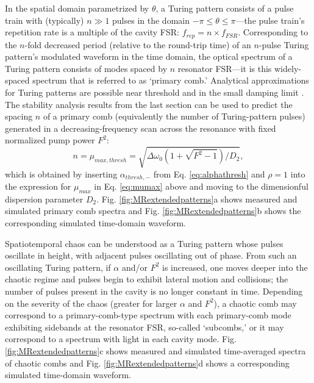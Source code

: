 In the spatial domain parametrized by $\theta$, a Turing pattern consists of a pulse train with (typically) $n\gg1$ pulses in the domain $-\pi\leq\theta\leq\pi$---the pulse train's repetition rate is a multiple of the cavity FSR: $f_{rep}=n\times f_{FSR}$. Corresponding to the $n$-fold decreased period (relative to the round-trip time) of an $n$-pulse Turing pattern's modulated waveform in the time domain, the optical spectrum of a Turing pattern consists of modes spaced by $n$ resonator FSR---it is this widely-spaced spectrum that is referred to as `primary comb.'  Analytical approximations for Turing patterns are possible near threshold \cite{Lugiato1987,Lugiato1987a} and in the small damping limit \cite{Renninger2016}. The stability analysis results from the last section can be used to predict the spacing $n$ of a primary comb (equivalently the number of Turing-pattern pulses) generated in a decreasing-frequency scan across the resonance with fixed normalized pump power $F^2$:
\begin{equation}
n=\mu_{max,thresh}=\sqrt{\Delta\omega_0(1+\sqrt{F^2-1})/D_2},
\end{equation}
which is obtained by inserting $\alpha_{thresh,-}$ from Eq. \ref{eq:alphathresh} and $\rho=1$ into the expression for $\mu_{max}$ in Eq. \ref{eq:mumax} above and moving to the dimensionful dispersion parameter $D_2$. Fig. \ref{fig:MRextendedpatterns}a shows measured and simulated primary comb spectra and Fig. \ref{fig:MRextendedpatterns}b shows the corresponding simulated time-domain waveform.

Spatiotemporal chaos can be understood as a Turing pattern whose pulses oscillate in height, with adjacent pulses oscillating out of phase. From such an oscillating Turing pattern, if $\alpha$ and/or $F^2$ is increased, one moves deeper into the chaotic regime and pulses begin to exhibit lateral motion and collisions; the number of pulses present in the cavity is no longer constant in time. Depending on the severity of the chaos (greater for larger $\alpha$ and $F^2$), a chaotic comb may correspond to a primary-comb-type spectrum with each primary-comb mode exhibiting sidebands at the resonator FSR, so-called `subcombs,' or it may correspond to a spectrum with light in each cavity mode. Fig. \ref{fig:MRextendedpatterns}c shows measured and simulated time-averaged spectra of chaotic combs and Fig. \ref{fig:MRextendedpatterns}d shows a corresponding simulated time-domain waveform.

